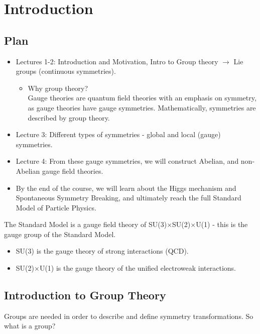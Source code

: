 \documentclass[a4paper, 11pt, normalem]{report}
\begin{document}
\chapter{Introduction}
\section{Plan}
\begin{itemize}
    \item Lectures 1-2: Introduction and Motivation, Intro to Group theory $\to$ Lie groups (continuous symmetries).
        \begin{itemize}
            \item Why group theory?\\ Gauge theories are quantum field theories with an emphasis on symmetry, as gauge theories have gauge symmetries. Mathematically, symmetries are described by group theory.
        \end{itemize}
    \item Lecture 3: Different types of symmetries - global and local (gauge) symmetries.
    \item Lecture 4: From these gauge symmetries, we will construct Abelian, and non-Abelian gauge field theories.
    \item By the end of the course, we will learn about the Higgs mechanism and Spontaneous Symmetry Breaking, and ultimately reach the full Standard Model of Particle Physics.
\end{itemize}
The Standard Model is a gauge field theory of SU(3)$\times$SU(2)$\times$U(1) - this is the gauge group of the Standard Model.
\begin{itemize}
    \item SU(3) is the gauge theory of strong interactions (QCD).
    \item SU(2)$\times$U(1) is the gauge theory of the unified electroweak interactions.
\end{itemize}

\section{Introduction to Group Theory}
Groups are needed in order to describe and define symmetry transformations.
So what is a group?
\end{document}
